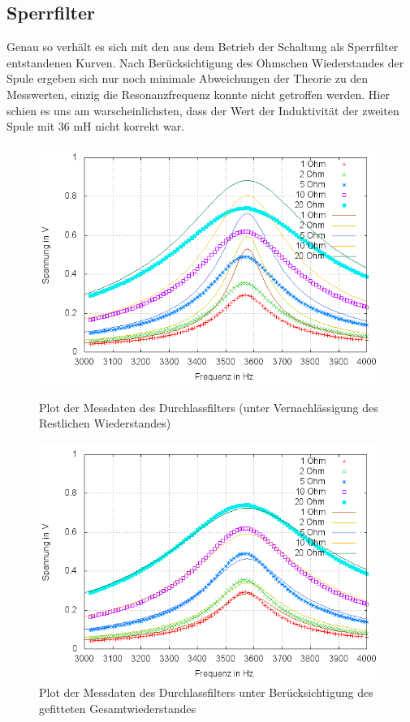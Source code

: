 \subsection{Sperrfilter}
Genau so verhält es sich mit den aus dem Betrieb der Schaltung als Sperrfilter entstandenen Kurven. Nach Berücksichtigung des Ohmschen Wiederstandes der Spule ergeben sich nur noch minimale Abweichungen der Theorie zu den Messwerten, einzig die Resonanzfrequenz konnte nicht getroffen werden. Hier schien es uns am warscheinlichsten, dass der Wert der Induktivität der zweiten Spule mit 36 mH nicht korrekt war.
\begin{figure}
        \includegraphics[width=.9\textwidth]{images/plot/durchlassfilter+theorie+R_ges.png}
\caption{Plot der Messdaten des Durchlassfilters (unter Vernachlässigung des Restlichen Wiederstandes)}
\label{plot:durchlass+R_ges}

	\includegraphics[width=.9\textwidth]{images/plot/durchlassfilter+theorie+R_ges-fit.png}
\caption{Plot der Messdaten des Durchlassfilters unter Berücksichtigung des gefitteten Gesamtwiederstandes}
\label{plot:durchlass+R_ges-fit}
\end{figure}
